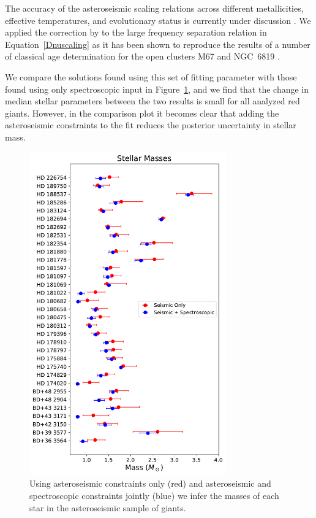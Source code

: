 \documentclass[a4paper,fleqn,usenatbib]{mnras}
\begin{document}
The accuracy of the asteroseismic scaling relations across different metallicities, effective temperatures, and evolutionary status is currently under discussion \citep[see][]{white2011,belkacem2011,sharma2016,viani2017}.
We applied the correction by \cite{Serenelli:2017cn} to the large frequency separation relation in Equation~\ref{Dnuscaling} as it has been shown to reproduce the results of a number of classical age determination for the open clusters M67 \citep{stello2016} and NGC~6819 \citep{casagrande2016}.

We compare the solutions found using this set of fitting parameter with those found using only spectroscopic input in Figure~\ref{masses}, and we find that the change in median stellar parameters between the two results is small for all analyzed red giants. However, in the comparison plot it becomes clear that adding the asteroseismic constraints to the fit reduces the posterior uncertainty in stellar mass.


\begin{figure}
\noindent\includegraphics[width=8.5cm,keepaspectratio]{different_constraints_ben.pdf}

\caption{\label{masses}
Using asteroseismic constraints only (red) and asteroseismic and spectroscopic constraints jointly (blue) we infer the masses of each star in the asteroseismic sample of giants.}
\end{figure}
\end{document}
